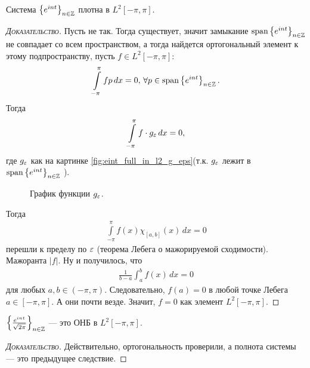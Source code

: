 \documentclass[../complex-analysis.tex]{subfiles}
\begin{document}
\begin{crly}
 Система $ \left\{e^{int}\right\}_{n \in \mathbb{Z}}  $ плотна в $ L^{2}[-\pi,\pi] $.
\end{crly}
\begin{proof}[\normalfont\textsc{Доказательство}]
	Пусть не так. Тогда существует, значит замыкание $\mathrm{span} \left\{ e^{int} \right\}_{n \in \mathbb{Z}}$ не совпадает со всем пространством, а тогда найдется ортогональный элемент к этому подпространству, пусть $ f \in L^{2}[-\pi,\pi] $:
 \begin{align*}
  \int\limits_{-\pi}^{\pi} f p \,dx = 0, \, \forall p \in \mathrm{span} \left\{ e^{int} \right\}_{n \in \mathbb{Z}}.
 \end{align*} Тогда 
 \begin{align*}
  \int\limits_{-\pi}^{\pi} f \cdot g_\varepsilon \, dx = 0,
\end{align*} где $ g_\varepsilon $ как на картинке \eqref{fig:eint_full_in_l2_g_eps}(т.к. $g_{\varepsilon}$ лежит в $\mathrm{span} \left\{ e^{int} \right\}_{n \in \mathbb{Z}}$  ).

\begin{figure}[ht]
    \centering
	\caption{График функции $g_{\varepsilon}$. }
    \label{fig:eint_full_in_l2_g_eps}
\end{figure}

 Тогда
 \begin{align*}
  \int\limits_{-\pi}^{\pi} f(x) \chi_{[a,b]}(x) \,dx = 0
 \end{align*} перешли к пределу по $ \varepsilon $ (теорема Лебега о мажорируемой сходимости). Мажоранта $ \left| f \right| $. Ну и получилось, что 
 \begin{align*}
  \frac{1}{b-a} \int_a^{b} f(x)\,dx = 0
 \end{align*} для любых $ a,  b \in(-\pi,\pi)$. Следовательно, $ f(a) = 0 $ в любой точке Лебега $ a \in [-\pi,\pi] $. А они почти везде. Значит, $ f = 0 $ как элемент $ L^{2}[-\pi,\pi] $.
\end{proof}

\begin{crly}
 $ \left\{\frac{e^{int}}{\sqrt{2\pi}}\right\}_{n \in \mathbb{Z}} $ --- это ОНБ в $ L^{2}[-\pi,\pi] $.
\end{crly}
\begin{proof}[\normalfont\textsc{Доказательство}]
 Действительно, ортогональность проверили, а полнота системы --- это предыдущее следствие.
\end{proof}
\end{document}
